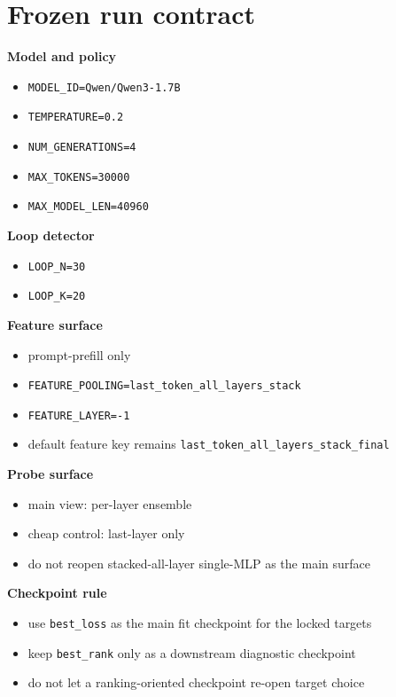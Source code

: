 \documentclass[11pt]{article}
\begin{document}
\section*{Frozen run contract}

\textbf{Model and policy}
\begin{itemize}[leftmargin=1.5em]
\item \texttt{MODEL\_ID=Qwen/Qwen3-1.7B}
\item \texttt{TEMPERATURE=0.2}
\item \texttt{NUM\_GENERATIONS=4}
\item \texttt{MAX\_TOKENS=30000}
\item \texttt{MAX\_MODEL\_LEN=40960}
\end{itemize}

\textbf{Loop detector}
\begin{itemize}[leftmargin=1.5em]
\item \texttt{LOOP\_N=30}
\item \texttt{LOOP\_K=20}
\end{itemize}

\textbf{Feature surface}
\begin{itemize}[leftmargin=1.5em]
\item prompt-prefill only
\item \texttt{FEATURE\_POOLING=last\_token\_all\_layers\_stack}
\item \texttt{FEATURE\_LAYER=-1}
\item default feature key remains \texttt{last\_token\_all\_layers\_stack\_final}
\end{itemize}

\textbf{Probe surface}
\begin{itemize}[leftmargin=1.5em]
\item main view: per-layer ensemble
\item cheap control: last-layer only
\item do not reopen stacked-all-layer single-MLP as the main surface
\end{itemize}

\textbf{Checkpoint rule}
\begin{itemize}[leftmargin=1.5em]
\item use \texttt{best\_loss} as the main fit checkpoint for the locked targets
\item keep \texttt{best\_rank} only as a downstream diagnostic checkpoint
\item do not let a ranking-oriented checkpoint re-open target choice
\end{itemize}
\end{document}
